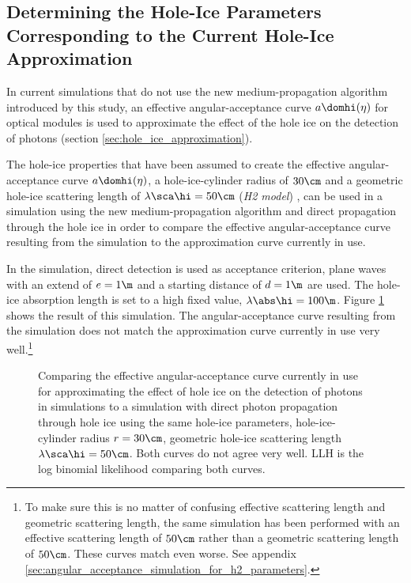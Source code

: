 
\subsection{Determining the Hole-Ice Parameters Corresponding to the Current Hole-Ice Approximation}
\label{sec:parameter_scan}

In current \clsim simulations that do not use the new medium-propagation algorithm introduced by this study, an effective angular-acceptance curve $a\domhi(\eta)$ for optical modules is used to approximate the effect of the hole ice on the detection of photons (section \ref{sec:hole_ice_approximation}).

The hole-ice properties that have been assumed to create the effective angular-acceptance curve $a\domhi(\eta)$, a hole-ice-cylinder radius of $30\cm$ and a geometric hole-ice scattering length of $\lambda\sca\hi = 50\cm$ (\textit{H2 model}) \cite{holeicestudieswithyag}, can be used in a \clsim simulation using the new medium-propagation algorithm and direct propagation through the hole ice in order to compare the effective angular-acceptance curve resulting from the simulation to the approximation curve currently in use.


In the simulation, direct detection is used as acceptance criterion, plane waves with an extend of $e=1\m$ and a starting distance of $d=1\m$ are used. The hole-ice absorption length is set to a high fixed value, $\lambda\abs\hi = 100\m$.
Figure \ref{fig:chie4Ite} shows the result of this simulation. The angular-acceptance curve resulting from the simulation does not match the approximation curve currently in use very well.\footnote{To make sure this is no matter of confusing effective scattering length and geometric scattering length, the same simulation has been performed with an effective scattering length of $50\cm$ rather than a geometric scattering length of $50\cm$. These curves match even worse. See appendix \ref{sec:angular_acceptance_simulation_for_h2_parameters}.}

\begin{figure}[htbp]
  \caption{Comparing the effective angular-acceptance curve currently in use for approximating the effect of hole ice on the detection of photons in simulations to a simulation with direct photon propagation through hole ice using the same hole-ice parameters, hole-ice-cylinder radius $r=30\cm$, geometric hole-ice scattering length $\lambda\sca\hi = 50\cm$. Both curves do not agree very well. LLH is the log binomial likelihood comparing both curves.}
  \label{fig:chie4Ite}
\end{figure}

